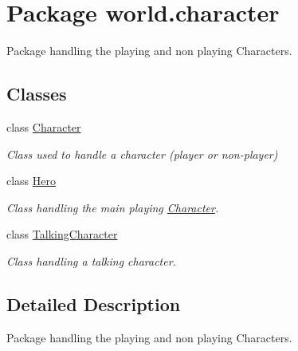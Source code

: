 \hypertarget{a00090}{\section{Package world.\-character}
\label{a00090}
}


Package handling the playing and non playing Characters.  


\subsection*{Classes}
\begin{DoxyCompactItemize}
\item 
class \hyperlink{a00005}{Character}
\begin{DoxyCompactList}\small\item\em Class used to handle a character (player or non-\/player) \end{DoxyCompactList}\item 
class \hyperlink{a00013}{Hero}
\begin{DoxyCompactList}\small\item\em Class handling the main playing \hyperlink{a00005}{Character}. \end{DoxyCompactList}\item 
class \hyperlink{a00029}{Talking\-Character}
\begin{DoxyCompactList}\small\item\em Class handling a talking character. \end{DoxyCompactList}\end{DoxyCompactItemize}


\subsection{Detailed Description}
Package handling the playing and non playing Characters. 
